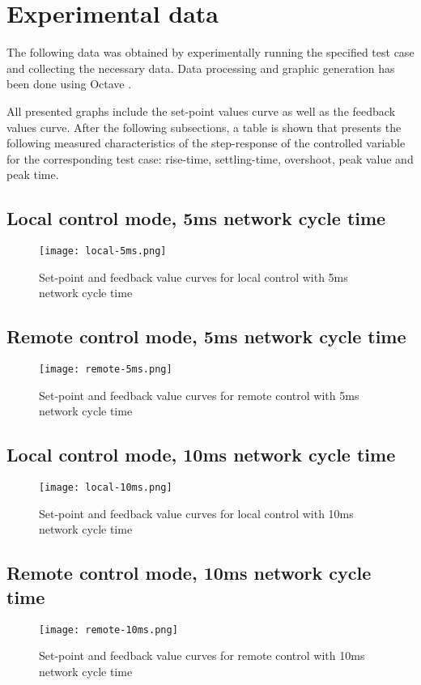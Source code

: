 \section{Experimental data}
The following data was obtained by experimentally running the specified test case and collecting the necessary data.
Data processing and graphic generation has been done using Octave \cite{sw:octave}.

All presented graphs include the set-point values curve as well as the feedback values curve.
After the following subsections, a table is shown that presents the following measured characteristics of the step-response of the controlled variable for the corresponding test case: rise-time, settling-time, overshoot, peak value and peak time.

\subsection*{Local control mode, 5ms network cycle time}
\begin{figure}[H]
	\centering
	\texttt{[image: local-5ms.png]}
	\caption{Set-point and feedback value curves for local control with 5ms network cycle time}
	\label{fig:local-5ms}
\end{figure}

\subsection*{Remote control mode, 5ms network cycle time}
\begin{figure}[H]
	\centering
	\texttt{[image: remote-5ms.png]}
	\caption{Set-point and feedback value curves for remote control with 5ms network cycle time}
	\label{fig:remote-5ms}
\end{figure}

\subsection*{Local control mode, 10ms network cycle time}
\begin{figure}[H]
	\centering
	\texttt{[image: local-10ms.png]}
	\caption{Set-point and feedback value curves for local control with 10ms network cycle time}
	\label{fig:local-10ms}
\end{figure}

\subsection*{Remote control mode, 10ms network cycle time}
\begin{figure}[H]
	\centering
	\texttt{[image: remote-10ms.png]}
	\caption{Set-point and feedback value curves for remote control with 10ms network cycle time}
	\label{fig:remote-10ms}
\end{figure}

